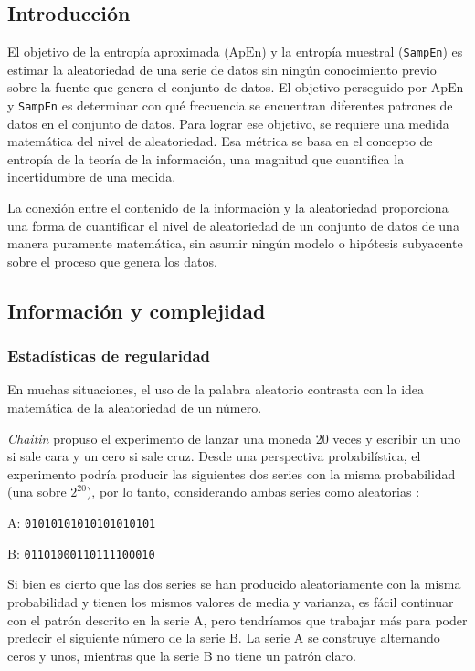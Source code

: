 \documentclass[a4paper,12pt]{article}
\begin{document}
\subsection{Introducción}
El objetivo de la entropía aproximada ($\textrm{ApEn}$) y la entropía muestral (\texttt{SampEn}) es estimar la aleatoriedad de una serie de datos sin ningún conocimiento previo sobre la fuente que genera el conjunto de datos. El objetivo perseguido por $\textrm{ApEn}$ y \texttt{SampEn} es determinar con qué frecuencia se encuentran diferentes patrones de datos en el conjunto de datos. Para lograr ese objetivo, se requiere una medida matemática del nivel de aleatoriedad. Esa métrica se basa en el concepto de entropía de la teoría de la información, una magnitud que cuantifica la incertidumbre de una medida.

La conexión entre el contenido de la información y la aleatoriedad proporciona una forma de cuantificar el nivel de aleatoriedad de un conjunto de datos de una manera puramente matemática, sin asumir ningún modelo o hipótesis subyacente sobre el proceso que genera los datos. 

\subsection{Información y complejidad}
\subsubsection{Estadísticas de regularidad} 
En muchas situaciones, el uso de la palabra aleatorio contrasta con la idea matemática de la aleatoriedad de un número. 

\textit{Chaitin} \citep{chaitin} propuso el experimento de lanzar una moneda 20 veces y escribir un uno si sale cara y un cero si sale cruz. Desde una perspectiva probabilística, el experimento podría producir las siguientes dos series con la misma probabilidad (una sobre $2^{20}$), por lo tanto, considerando ambas series como aleatorias : 

A: \texttt{01010101010101010101}

B: \texttt{01101000110111100010}

Si bien es cierto que las dos series se han producido aleatoriamente con la misma probabilidad y tienen los mismos valores de media y varianza, es fácil continuar con el patrón descrito en la serie A, pero tendríamos que trabajar más para poder predecir el siguiente número de la serie B. La serie A se construye alternando ceros y unos, mientras que la serie B no tiene un patrón claro. 
\end{document}
